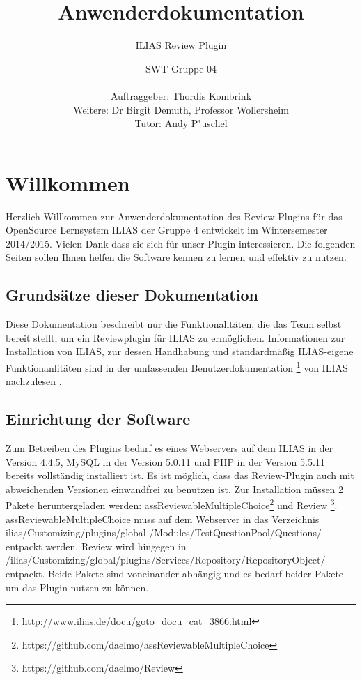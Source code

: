 \documentclass[12pt,a4paper]{scrreprt}
\begin{document}
\title{Anwenderdokumentation}
\subtitle{ILIAS Review Plugin}
\publishers{Version: 5.0, Status: Fertiggestellt}
\author{SWT-Gruppe 04\\ \\Auftraggeber: Thordis Kombrink\\Weitere: Dr Birgit Demuth, Professor Wollersheim\\Tutor: Andy P"uschel}
\maketitle
\tableofcontents

\chapter{Willkommen}
Herzlich Willkommen zur Anwenderdokumentation des Review-Plugins für das OpenSource Lernsystem ILIAS der Gruppe 4 entwickelt im Wintersemester 2014/2015. Vielen Dank dass sie sich für unser Plugin interessieren. Die folgenden Seiten sollen Ihnen helfen die Software kennen zu lernen und effektiv zu nutzen. 

\section{Grundsätze dieser Dokumentation}
Diese Dokumentation beschreibt nur die Funktionalitäten, die das Team selbst bereit stellt, um ein Reviewplugin für ILIAS zu ermöglichen. Informationen zur Installation von ILIAS, zur dessen Handhabung und standardmäßig ILIAS-eigene Funktionanlitäten sind in der umfassenden Benutzerdokumentation
\footnote{\label{foot:1}http://www.ilias.de/docu/goto\_docu\_cat\_3866.html} von ILIAS nachzulesen . 

\section{Einrichtung der Software}
Zum Betreiben des Plugins bedarf es eines Webservers auf dem ILIAS in der Version 4.4.5, MySQL in der Version 5.0.11 und PHP in der Version 5.5.11 bereits vollständig installiert ist. Es ist möglich, dass das Review-Plugin auch mit abweichenden Versionen einwandfrei zu benutzen ist.
Zur Installation müssen 2 Pakete heruntergeladen werden: assReviewableMultipleChoice\footnote{\label{foot:2}https://github.com/daelmo/assReviewableMultipleChoice}	und Review
\footnote{\label{foot:3}https://github.com/daelmo/Review}. 
	assReviewableMultipleChoice muss auf dem Webserver in das Verzeichnis ilias/Customizing/plugins/global /Modules/TestQuestionPool/Questions/ entpackt werden. Review wird hingegen in /ilias/Customizing/global/plugins/Services/Repository/RepositoryObject/ entpackt.
	Beide Pakete sind voneinander abhängig und es bedarf beider Pakete um das Plugin nutzen zu können.
	
\end{document}
